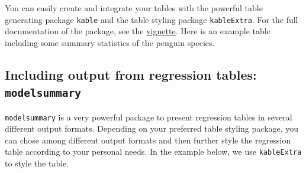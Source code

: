 \documentclass[
  11pt,
]{scrartcl}
\begin{document}
You can easily create and integrate your tables with the powerful table generating package \texttt{kable} and the table styling package \texttt{kableExtra}. For the full documentation of the package, see the \href{https://haozhu233.github.io/kableExtra/awesome_table_in_pdf.pdf}{vignette}. Here is an example table including some summary statistics of the penguin species.

\begin{table}[!h]

\caption{\label{tab:kable-advanced}Differences in Flipper and Bill Length across Penguin Species}
\centering
{}
\end{table}

\hypertarget{including-output-from-regression-tables-modelsummary}{%
\subsection{\texorpdfstring{Including output from regression tables: \texttt{modelsummary}}{Including output from regression tables: modelsummary}}\label{including-output-from-regression-tables-modelsummary}}

\texttt{modelsummary} is a very powerful package to present regression tables in several different output formats. Depending on your preferred table styling package, you can chose among different output formats and then further style the regression table according to your personal needs. In the example below, we use \texttt{kableExtra} to style the table.
\end{document}
